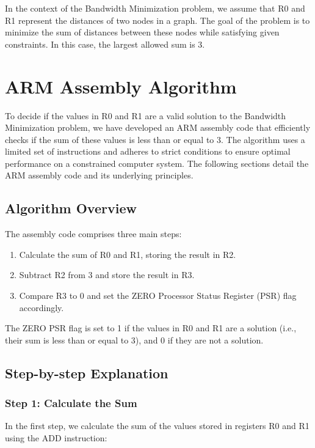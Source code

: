 In the context of the Bandwidth Minimization problem, we assume that R0 and R1 represent the distances of two nodes in a graph. The goal of the problem is to minimize the sum of distances between these nodes while satisfying given constraints. In this case, the largest allowed sum is 3.

\section{ARM Assembly Algorithm}

To decide if the values in R0 and R1 are a valid solution to the Bandwidth Minimization problem, we have developed an ARM assembly code that efficiently checks if the sum of these values is less than or equal to 3. The algorithm uses a limited set of instructions and adheres to strict conditions to ensure optimal performance on a constrained computer system. The following sections detail the ARM assembly code and its underlying principles.

\subsection{Algorithm Overview}

The assembly code comprises three main steps:
\begin{enumerate}
    \item Calculate the sum of R0 and R1, storing the result in R2.
    \item Subtract R2 from 3 and store the result in R3.
    \item Compare R3 to 0 and set the ZERO Processor Status Register (PSR) flag accordingly.
\end{enumerate}

The ZERO PSR flag is set to 1 if the values in R0 and R1 are a solution (i.e., their sum is less than or equal to 3), and 0 if they are not a solution.

\subsection{Step-by-step Explanation}

\subsubsection{Step 1: Calculate the Sum}

In the first step, we calculate the sum of the values stored in registers R0 and R1 using the ADD instruction:


